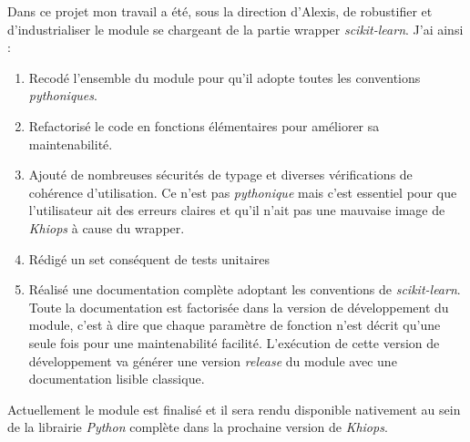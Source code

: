 \documentclass[12pt]{report}
\begin{document}
	Dans ce projet mon travail a été, sous la direction d'Alexis, de robustifier et d’industrialiser le module se chargeant de la partie wrapper \textit{scikit-learn}. J'ai ainsi :
	\begin{enumerate}
		\item Recodé l'ensemble du module pour qu'il adopte toutes les conventions \textit{pythoniques}.
		\item Refactorisé le code en fonctions élémentaires pour améliorer sa maintenabilité.
		\item Ajouté de nombreuses sécurités de typage et diverses vérifications de cohérence d'utilisation. Ce n'est pas \textit{pythonique} mais c'est essentiel pour que l'utilisateur ait des erreurs claires et qu'il n'ait pas une mauvaise image de \textit{Khiops} à cause du wrapper.
		\item Rédigé un set conséquent de tests unitaires
		\item Réalisé une documentation complète adoptant les conventions de \textit{scikit-learn}. Toute la documentation est factorisée dans la version de développement du module, c'est à dire que chaque paramètre de fonction n'est décrit qu'une seule fois pour une maintenabilité facilité. L'exécution de cette version de développement va générer une version \textit{release} du module avec une documentation lisible classique.
	\end{enumerate}
	
	Actuellement le module est finalisé et il sera rendu disponible nativement au sein de la librairie \textit{Python} complète dans la prochaine version de \textit{Khiops}.
	
\end{document}
